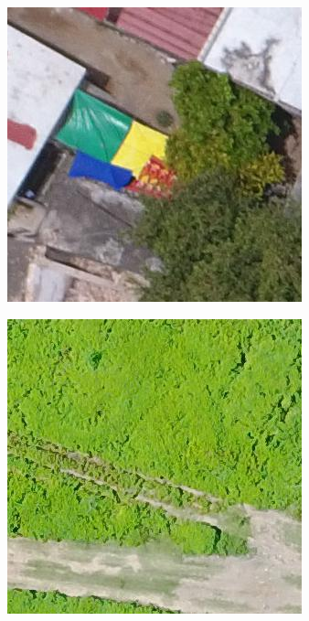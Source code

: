 \begin{figure}[!ht]
\begin{subfigure}{.24\textwidth}
    \end{subfigure}
    \begin{subfigure}{.24\textwidth}
        \includegraphics[width=\textwidth]{images/nondamaged3.jpg}
    \end{subfigure}
    \begin{subfigure}{.24\textwidth}
        \includegraphics[width=\textwidth]{images/nondamaged4.jpg}

\end{subfigure}
\end{figure}
